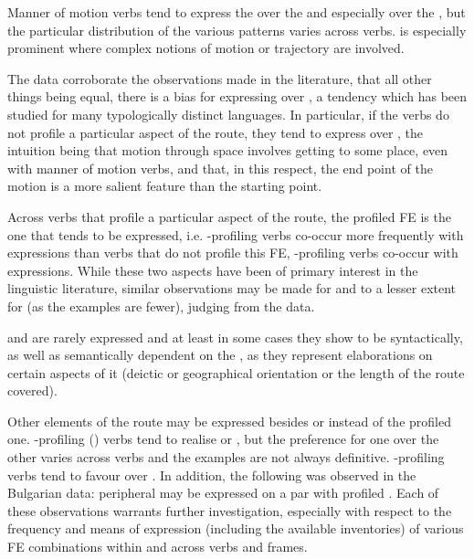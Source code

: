 \documentclass[output=paper,colorlinks,citecolor=brown]{langscibook}
\begin{document}
Manner of motion verbs tend to express the  over the  and especially over the , but the particular distribution of the various patterns varies across verbs.  is especially prominent where complex notions of motion or trajectory are involved. 

The data corroborate the observations made in the literature, that all other things being equal, there is a bias for expressing  over , a tendency which has been studied for many typologically distinct languages. In particular, if the verbs do not profile a particular aspect of the route, they tend to express  over , the intuition being that motion through space involves getting to some place, even with manner of motion verbs, and that, in this respect, the end point of the motion is a more salient feature than the starting point. 

Across verbs that profile a particular aspect of the route, the profiled FE is the one that tends to be expressed, i.e. -profiling verbs co-occur more frequently with  expressions than verbs that do not profile this FE, -profiling verbs co-occur with  expressions. While these two aspects have been of primary interest in the linguistic literature, similar observations may be made for  and to a lesser extent for  (as the examples are fewer), judging from the data. 

 and  are rarely expressed and at least in some cases they show to be syntactically, as well as semantically dependent on the , as they represent elaborations on certain aspects of it (deictic or geographical orientation or the length of the route covered). 

Other elements of the route may be expressed besides or instead of the profiled one. %
-profiling () verbs tend to realise  or , but the preference for one over the other varies across verbs and the examples are not always definitive. -profiling verbs tend to favour  over . In addition, the following was observed in the Bulgarian data: peripheral  may be expressed on a par with profiled . Each of these observations warrants further investigation, especially with respect to the frequency and means of expression (including the available inventories) of various FE combinations within and across verbs and frames.
\end{document}
